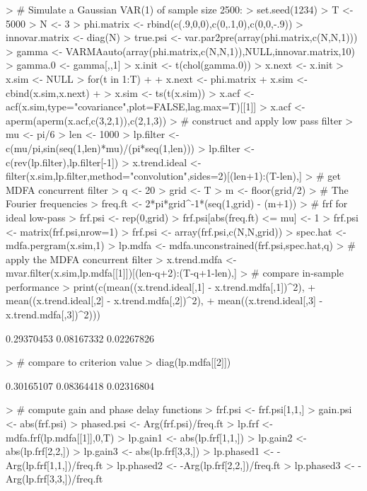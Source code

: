 \documentclass[a4paper]{book}
\begin{document}
\begin{Schunk}
\begin{Sinput}
> # Simulate a Gaussian VAR(1) of sample size 2500:
> set.seed(1234)
> T <- 5000
> N <- 3
> phi.matrix <- rbind(c(.9,0,0),c(0,.1,0),c(0,0,-.9))
> innovar.matrix <- diag(N)
> true.psi <- var.par2pre(array(phi.matrix,c(N,N,1)))
> gamma <- VARMAauto(array(phi.matrix,c(N,N,1)),NULL,innovar.matrix,10)
> gamma.0 <- gamma[,,1]
> x.init <- t(chol(gamma.0)) %
> x.next <- x.init
> x.sim <- NULL
> for(t in 1:T)
+ {
+ 	x.next <- phi.matrix %
+ 	x.sim <- cbind(x.sim,x.next)
+ }
> x.sim <- ts(t(x.sim))
> x.acf <- acf(x.sim,type="covariance",plot=FALSE,lag.max=T)[[1]]
> x.acf <- aperm(aperm(x.acf,c(3,2,1)),c(2,1,3))
> # construct and apply low pass filter
> mu <- pi/6
> len <- 1000
> lp.filter <- c(mu/pi,sin(seq(1,len)*mu)/(pi*seq(1,len)))
> lp.filter <- c(rev(lp.filter),lp.filter[-1])
> x.trend.ideal <- filter(x.sim,lp.filter,method="convolution",sides=2)[(len+1):(T-len),]
> # get MDFA concurrent filter
> q <- 20
> grid <- T
> m <- floor(grid/2)
> # The Fourier frequencies
> freq.ft <- 2*pi*grid^{-1}*(seq(1,grid) - (m+1))
> # frf for ideal low-pass
> frf.psi <- rep(0,grid)
> frf.psi[abs(freq.ft) <= mu] <- 1
> frf.psi <- matrix(frf.psi,nrow=1) %
> frf.psi <- array(frf.psi,c(N,N,grid))
> spec.hat <- mdfa.pergram(x.sim,1)	
> lp.mdfa <- mdfa.unconstrained(frf.psi,spec.hat,q)
> # apply the MDFA concurrent filter
> x.trend.mdfa <- mvar.filter(x.sim,lp.mdfa[[1]])[(len-q+2):(T-q+1-len),]
> # compare in-sample performance
> print(c(mean((x.trend.ideal[,1] - x.trend.mdfa[,1])^2),
+ 	mean((x.trend.ideal[,2] - x.trend.mdfa[,2])^2),
+ 	mean((x.trend.ideal[,3] - x.trend.mdfa[,3])^2)))
\end{Sinput}
\begin{Soutput}
[1] 0.29370453 0.08167332 0.02267826
\end{Soutput}
\begin{Sinput}
> # compare to criterion value
> diag(lp.mdfa[[2]])
\end{Sinput}
\begin{Soutput}
[1] 0.30165107 0.08364418 0.02316804
\end{Soutput}
\begin{Sinput}
> # compute gain and phase delay functions
> frf.psi <- frf.psi[1,1,]
> gain.psi <- abs(frf.psi)
> phased.psi <- Arg(frf.psi)/freq.ft
> lp.frf <- mdfa.frf(lp.mdfa[[1]],0,T)
> lp.gain1 <- abs(lp.frf[1,1,])
> lp.gain2 <- abs(lp.frf[2,2,])
> lp.gain3 <- abs(lp.frf[3,3,])
> lp.phased1 <- -Arg(lp.frf[1,1,])/freq.ft
> lp.phased2 <- -Arg(lp.frf[2,2,])/freq.ft
> lp.phased3 <- -Arg(lp.frf[3,3,])/freq.ft
\end{Sinput}
\end{Schunk}
\end{document}
